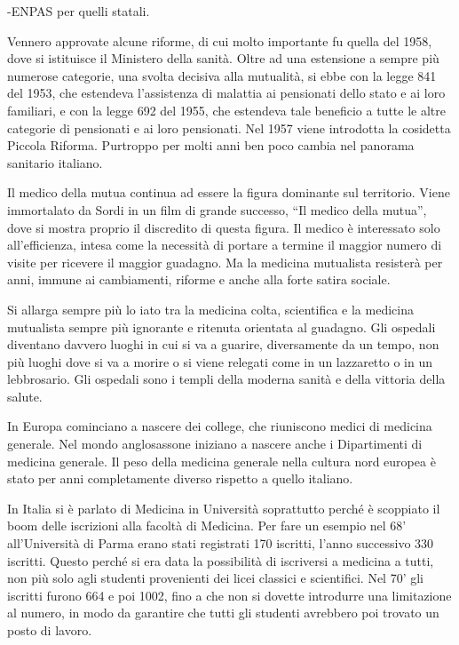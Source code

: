 \documentclass[]{article}
\begin{document}
-ENPAS per quelli statali.

Vennero approvate alcune riforme, di cui molto importante fu quella del
1958, dove si istituisce il Ministero della sanità. Oltre ad una
estensione a sempre più numerose categorie, una svolta decisiva alla
mutualità, si ebbe con la legge 841 del 1953, che estendeva l'assistenza
di malattia ai pensionati dello stato e ai loro familiari, e con la
legge 692 del 1955, che estendeva tale beneficio a tutte le altre
categorie di pensionati e ai loro pensionati. Nel 1957 viene introdotta
la cosidetta Piccola Riforma. Purtroppo per molti anni ben poco cambia
nel panorama sanitario italiano.

Il medico della mutua continua ad essere la figura dominante sul
territorio. Viene immortalato da Sordi in un film di grande successo,
``Il medico della mutua'', dove si mostra proprio il discredito di
questa figura. Il medico è interessato solo all'efficienza, intesa come
la necessità di portare a termine il maggior numero di visite per
ricevere il maggior guadagno. Ma la medicina mutualista resisterà per
anni, immune ai cambiamenti, riforme e anche alla forte satira sociale.

Si allarga sempre più lo iato tra la medicina colta, scientifica e la
medicina mutualista sempre più ignorante e ritenuta orientata al
guadagno. Gli ospedali diventano davvero luoghi in cui si va a guarire,
diversamente da un tempo, non più luoghi dove si va a morire o si viene
relegati come in un lazzaretto o in un lebbrosario. Gli ospedali sono i
templi della moderna sanità e della vittoria della salute.

In Europa cominciano a nascere dei college, che riuniscono medici di
medicina generale. Nel mondo anglosassone iniziano a nascere anche i
Dipartimenti di medicina generale. Il peso della medicina generale nella
cultura nord europea è stato per anni completamente diverso rispetto a
quello italiano.

In Italia si è parlato di Medicina in Università soprattutto perché è
scoppiato il boom delle iscrizioni alla facoltà di Medicina. Per fare un
esempio nel 68' all'Università di Parma erano stati registrati 170
iscritti, l'anno successivo 330 iscritti. Questo perché si era data la
possibilità di iscriversi a medicina a tutti, non più solo agli studenti
provenienti dei licei classici e scientifici. Nel 70' gli iscritti
furono 664 e poi 1002, fino a che non si dovette introdurre una
limitazione al numero, in modo da garantire che tutti gli studenti
avrebbero poi trovato un posto di lavoro.
\end{document}
